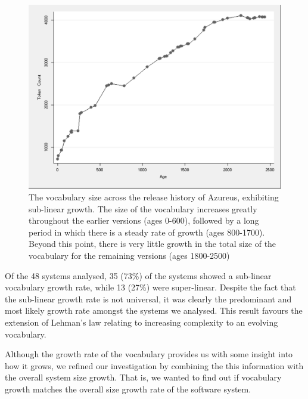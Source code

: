 \begin{figure}[t]
\centering
\includegraphics[width=\textwidth]{Figures/Vocab-AzureusGrowth.pdf}
\caption{The vocabulary size across the release history of Azureus, exhibiting sub-linear growth. The size of the vocabulary increases greatly throughout the earlier versions (ages 0-600), followed by a long period in which there is a steady rate of growth (ages 800-1700). Beyond this point, there is very little growth in the total size of the vocabulary for the remaining versions (ages 1800-2500)}
\label{fig:vocab-growth-azureus}
\end{figure}


Of the 48 systems analysed, 35 (73\%) of the systems showed a sub-linear vocabulary growth rate, while 13 (27\%) were super-linear. Despite the fact that the sub-linear growth rate is not universal, it was clearly the predominant and most likely growth rate amongst the systems we analysed. This result favours the extension of Lehman's law relating to increasing complexity to an evolving vocabulary.

Although the growth rate of the vocabulary provides us with some insight into how it grows,
we refined our investigation by combining the this information with the overall system size growth. That is, we wanted to find out if vocabulary growth matches the overall size growth rate of the software system.

